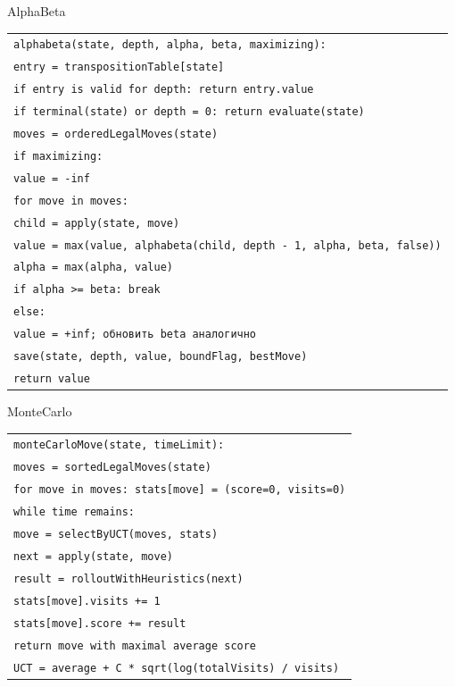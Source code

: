 \documentclass[fullscreen=true,russian,compress,%
    hyperref={unicode,bookmarks=false}]{presentation}
\begin{document}
\begin{frame}{AlphaBeta}
\begin{block}{}
\scriptsize
\begin{tabular}{@{}l@{}}
\texttt{alphabeta(state, depth, alpha, beta, maximizing):} \\
\quad \texttt{entry = transpositionTable[state]} \\
\quad \texttt{if entry is valid for depth: return entry.value} \\
\quad \texttt{if terminal(state) or depth = 0: return evaluate(state)} \\
\quad \texttt{moves = orderedLegalMoves(state)} \\
\quad \texttt{if maximizing:} \\
\quad\quad \texttt{value = -inf} \\
\quad\quad \texttt{for move in moves:} \\
\quad\quad\quad \texttt{child = apply(state, move)} \\
\quad\quad\quad \texttt{value = max(value, alphabeta(child, depth - 1, alpha, beta, false))} \\
\quad\quad\quad \texttt{alpha = max(alpha, value)} \\
\quad\quad\quad \texttt{if alpha >= beta: break} \\
\quad \texttt{else:} \\
\quad\quad \texttt{value = +inf; обновить beta аналогично} \\
\quad \texttt{save(state, depth, value, boundFlag, bestMove)} \\
\quad \texttt{return value}
\end{tabular}
\end{block}
\end{frame}

\begin{frame}{MonteCarlo}
\begin{block}{}
\scriptsize
\begin{tabular}{@{}l@{}}
\texttt{monteCarloMove(state, timeLimit):} \\
\quad \texttt{moves = sortedLegalMoves(state)} \\
\quad \texttt{for move in moves: stats[move] = (score=0, visits=0)} \\
\quad \texttt{while time remains:} \\
\quad\quad \texttt{move = selectByUCT(moves, stats)} \\
\quad\quad \texttt{next = apply(state, move)} \\
\quad\quad \texttt{result = rolloutWithHeuristics(next)} \\
\quad\quad \texttt{stats[move].visits += 1} \\
\quad\quad \texttt{stats[move].score += result} \\
\quad \texttt{return move with maximal average score} \\[.2cm]
\texttt{UCT = average + C * sqrt(log(totalVisits) / visits)}
\end{tabular}
\end{block}
\end{frame}
\end{document}
